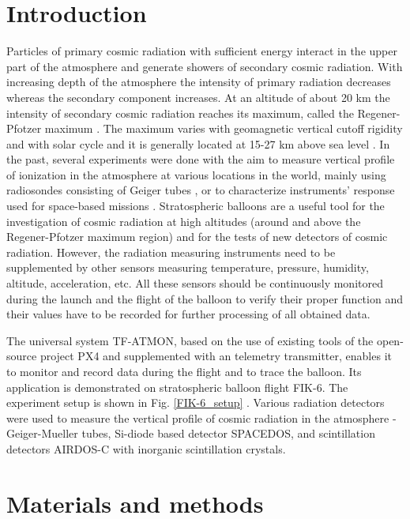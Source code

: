 \documentclass{Rpd}
\begin{document}
\section{Introduction}

Particles of primary cosmic radiation with sufficient energy interact in the upper part of the atmosphere and generate showers of secondary cosmic radiation. With increasing depth of the atmosphere the intensity of primary radiation decreases whereas the secondary component increases. At an altitude of about 20 km the intensity of secondary cosmic radiation reaches its maximum, called the Regener-Pfotzer maximum \cite{Regener, Pfotzer}. The maximum varies with geomagnetic vertical cutoff rigidity and with solar cycle and it is generally located at 15-27 km above sea level \cite{Bazilevskaya}.
In the past, several experiments were done with the aim to measure vertical profile of ionization in the atmosphere at various locations in the world, mainly using radiosondes consisting of Geiger tubes \cite{Bazilevskaya, ionization_profile, Vertical_profile_measurements, cosmic_ray_intensity, Radioactivity_atmosphere}, or to characterize instruments’ response used for space-based missions \cite{Lawrence, Mukherjee, Timepix}.
Stratospheric balloons are a useful tool for the investigation of cosmic radiation at high altitudes (around and above the Regener-Pfotzer maximum region) and for the tests of new detectors of cosmic radiation.
However, the radiation measuring instruments need to be supplemented by other sensors measuring temperature, pressure, humidity, altitude, acceleration, etc.  All these sensors should be continuously monitored during the launch and the flight of the balloon to verify their proper function and their values have to be recorded for further processing of all obtained data.

The universal system TF-ATMON, based on the use of existing tools of the open-source project PX4 and supplemented with an telemetry transmitter, enables it to monitor and record data during the flight and to trace the balloon. Its application is demonstrated on stratospheric balloon flight FIK-6. The experiment setup is shown in Fig. \ref{FIK-6_setup} . Various radiation detectors were used to measure the vertical profile of cosmic radiation in the atmosphere - Geiger-Mueller tubes, Si-diode based detector SPACEDOS, and scintillation detectors AIRDOS-C with inorganic scintillation crystals.

\section{Materials and methods}
\end{document}
